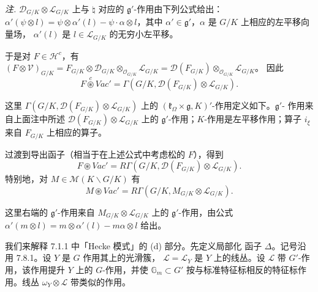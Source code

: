 \emph{注.} $\mathcal{D}_{G/K}\otimes\mathcal{L}_{G/K}$ 上与 $\natural$
对应的 $\mathfrak{g}'$-作用由下列公式给出：$\alpha'(\psi\otimes l)
=\psi\otimes\alpha'(l)-\psi\cdot\alpha\otimes l$，其中
$\alpha'\in\mathfrak{g}'$，$\alpha$ 是 $G/K$ 上相应的左平移向量场，
$\alpha'(l)$ 是 $l\in\mathcal{L}_{G/K}$ 的无穷小左平移。

于是对 $F\in\mathcal{H}^c$，有
$(F\otimes\mathcal{V})_{G/K}=F_{G/K}\otimes\mathcal{D}_{G/K}
\otimes_{\mathcal{O}_{G/K}}\mathcal{L}_{G/K}
=\mathcal{D}(F_{G/K})\otimes_{\mathcal{O}_{G/K}}\mathcal{L}_{G/K}$。
因此
\begin{equation}\tag{333}
F\overset{c}{\circledast}Vac'
=\Gamma(G/K,\mathcal{D}(F_{G/K})\otimes\mathcal{L}_{G/K}).
\end{equation}

这里 $\Gamma(G/K,\mathcal{D}(F_{G/K})\otimes\mathcal{L}_{G/K})$ 上的
$(\mathfrak{k}_\Omega\times\mathfrak{g},K)'$-作用定义如下。$\mathfrak{g}'$-
作用来自上面注中所述 $\mathcal{D}(F_{G/K})\otimes\mathcal{L}_{G/K}$ 上的
$\mathfrak{g}'$-作用；$K$-作用是左平移作用；算子 $i_\xi$ 来自
$F_{G/K}$ 上相应的算子。

过渡到导出函子（相当于在上述公式中考虑松的 $F$），得到
\begin{equation}\tag{334}
F\circledast Vac'=R\Gamma(G/K,
\mathcal{D}(F_{G/K})\otimes\mathcal{L}_{G/K}).
\end{equation}
特别地，对 $M\in\mathcal{M}(K\backslash G/K)$ 有
\begin{equation}\tag{335}
M\circledast Vac'=R\Gamma(G/K,
M_{G/K}\otimes\mathcal{L}_{G/K}).
\end{equation}


这里右端的 $\mathfrak{g}'$-作用来自
$M_{G/K}\otimes\mathcal{L}_{G/K}$ 上的 $\mathfrak{g}'$-作用，由公式
$\alpha'(m\otimes l)=m\otimes\alpha'(l)-m\alpha\otimes l$ 给出。

 我们来解释 7.1.1 中「Hecke 模式」的 (d) 部分。先定义局部化
函子 $\Delta$。记号沿用 7.8.1。设 $Y$ 是 $G$ 作用其上的光滑簇，
$\mathcal{L}=\mathcal{L}_Y$ 是 $Y$ 上的线丛。设 $\mathcal{L}$ 带
$G'$-作用，该作用提升 $Y$ 上的 $G$-作用，并使
$\mathbb{G}_m\subset G'$ 按与标准特征标相反的特征标作用。线丛
$\omega_Y\otimes\mathcal{L}$ 带类似的作用。


